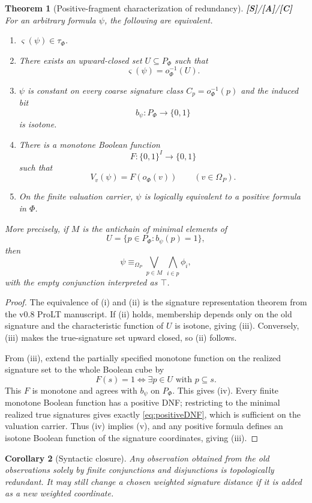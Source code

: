 \documentclass[11pt]{article}
\newtheorem{theorem}{Theorem}[section]
\newtheorem{corollary}[theorem]{Corollary}
\theoremstyle{definition}
\newcommand{\Om}{\Omega_P}
\newcommand{\truth}{\varsigma}
\newcommand{\statusS}{\textbf{[S]}}
\newcommand{\statusA}{\textbf{[A]}}
\newcommand{\statusC}{\textbf{[C]}}
\begin{document}
\begin{theorem}[Positive-fragment characterization of redundancy]\label{thm:positive}
\statusS/\statusA/\statusC\;
For an arbitrary formula $\psi$, the following are equivalent.
\begin{enumerate}[label=(\roman*)]
\item $\truth(\psi)\in\tau_\Phi$.
\item There exists an upward-closed set $U\subseteq P_\Phi$ such that
\[
\truth(\psi)=o_\Phi^{-1}(U).
\]
\item $\psi$ is constant on every coarse signature class $C_p=o_\Phi^{-1}(p)$ and the induced bit
\[
b_\psi:P_\Phi\to\{0,1\}
\]
is isotone.
\item There is a monotone Boolean function
\[
F:\{0,1\}^I\to\{0,1\}
\]
such that
\[
V_v(\psi)=F(o_\Phi(v))\qquad(v\in\Om).
\]
\item On the finite valuation carrier, $\psi$ is logically equivalent to a positive formula in $\Phi$.
\end{enumerate}
More precisely, if $M$ is the antichain of minimal elements of
\[
U=\{p\in P_\Phi:b_\psi(p)=1\},
\]
then
\begin{equation}\label{eq:positiveDNF}
\psi\equiv_{\Om}
\bigvee_{p\in M}\ \bigwedge_{i\in p}\phi_i,
\end{equation}
with the empty conjunction interpreted as $\top$.
\end{theorem}

\begin{proof}
The equivalence of (i) and (ii) is the signature representation theorem from the v0.8 ProLT manuscript. If (ii) holds, membership depends only on the old signature and the characteristic function of $U$ is isotone, giving (iii). Conversely, (iii) makes the true-signature set upward closed, so (ii) follows.

From (iii), extend the partially specified monotone function on the realized signature set to the whole Boolean cube by
\[
F(s)=1\iff \exists p\in U\text{ with }p\subseteq s.
\]
This $F$ is monotone and agrees with $b_\psi$ on $P_\Phi$. This gives (iv). Every finite monotone Boolean function has a positive DNF; restricting to the minimal realized true signatures gives exactly \eqref{eq:positiveDNF}, which is sufficient on the valuation carrier. Thus (iv) implies (v), and any positive formula defines an isotone Boolean function of the signature coordinates, giving (iii).
\end{proof}

\begin{corollary}[Syntactic closure]
Any observation obtained from the old observations solely by finite conjunctions and disjunctions is topologically redundant. It may still change a chosen weighted signature distance if it is added as a new weighted coordinate.
\end{corollary}
\end{document}
